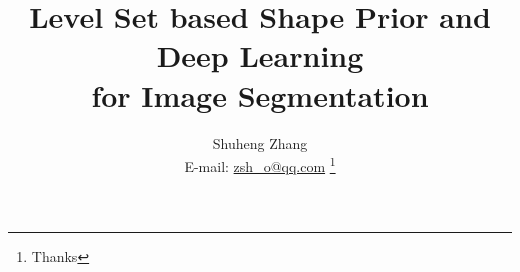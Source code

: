 \documentclass[journal]{IEEEtran}
\begin{document}
%
\title{Level Set based Shape Prior and Deep Learning \\for Image Segmentation}


%
\author{Shuheng Zhang \\ E-mail: \href{mailto:zsh_o@qq.com}{zsh\_o@qq.com}
    \thanks{Thanks}
}

%
%

%
\end{document}
